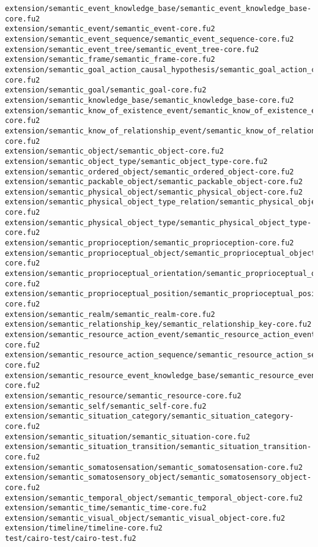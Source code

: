 \begin{lstlisting}
extension/semantic_event_knowledge_base/semantic_event_knowledge_base-core.fu2
extension/semantic_event/semantic_event-core.fu2
extension/semantic_event_sequence/semantic_event_sequence-core.fu2
extension/semantic_event_tree/semantic_event_tree-core.fu2
extension/semantic_frame/semantic_frame-core.fu2
extension/semantic_goal_action_causal_hypothesis/semantic_goal_action_causal_hypothesis-core.fu2
extension/semantic_goal/semantic_goal-core.fu2
extension/semantic_knowledge_base/semantic_knowledge_base-core.fu2
extension/semantic_know_of_existence_event/semantic_know_of_existence_event-core.fu2
extension/semantic_know_of_relationship_event/semantic_know_of_relationship_event-core.fu2
extension/semantic_object/semantic_object-core.fu2
extension/semantic_object_type/semantic_object_type-core.fu2
extension/semantic_ordered_object/semantic_ordered_object-core.fu2
extension/semantic_packable_object/semantic_packable_object-core.fu2
extension/semantic_physical_object/semantic_physical_object-core.fu2
extension/semantic_physical_object_type_relation/semantic_physical_object_type_relation-core.fu2
extension/semantic_physical_object_type/semantic_physical_object_type-core.fu2
extension/semantic_proprioception/semantic_proprioception-core.fu2
extension/semantic_proprioceptual_object/semantic_proprioceptual_object-core.fu2
extension/semantic_proprioceptual_orientation/semantic_proprioceptual_orientation-core.fu2
extension/semantic_proprioceptual_position/semantic_proprioceptual_position-core.fu2
extension/semantic_realm/semantic_realm-core.fu2
extension/semantic_relationship_key/semantic_relationship_key-core.fu2
extension/semantic_resource_action_event/semantic_resource_action_event-core.fu2
extension/semantic_resource_action_sequence/semantic_resource_action_sequence-core.fu2
extension/semantic_resource_event_knowledge_base/semantic_resource_event_knowledge_base-core.fu2
extension/semantic_resource/semantic_resource-core.fu2
extension/semantic_self/semantic_self-core.fu2
extension/semantic_situation_category/semantic_situation_category-core.fu2
extension/semantic_situation/semantic_situation-core.fu2
extension/semantic_situation_transition/semantic_situation_transition-core.fu2
extension/semantic_somatosensation/semantic_somatosensation-core.fu2
extension/semantic_somatosensory_object/semantic_somatosensory_object-core.fu2
extension/semantic_temporal_object/semantic_temporal_object-core.fu2
extension/semantic_time/semantic_time-core.fu2
extension/semantic_visual_object/semantic_visual_object-core.fu2
extension/timeline/timeline-core.fu2
test/cairo-test/cairo-test.fu2

\end{lstlisting}
